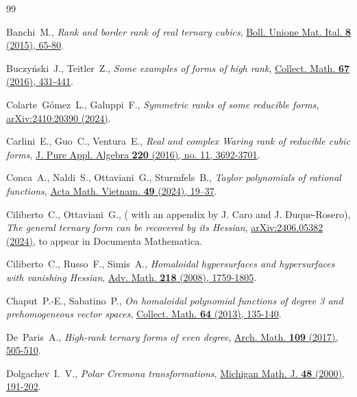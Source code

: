 \documentclass[aps,floatfix,groupedaddress,superscriptaddress,longbibliography,footinbib,notitlepage,showpacs]{revtex4-1}
\begin{document}

\begin{thebibliography}{99}

 {Banchi~M.,
\textit{Rank and border rank of real ternary cubics},
{\href{https://doi.org/10.1007/s40574-015-0027-z}{Boll. Unione Mat. Ital. \textbf{8} (2015), 65-80}}.}

 {Buczyński~J., Teitler~Z.,
\textit{Some examples of forms of high rank},
{\href{https://doi.org/10.1007/s13348-015-0152-0}{Collect. Math. \textbf{67} (2016), 431-441}}.}

 {Colarte~G\'omez~L., Galuppi~F.,
\textit{Symmetric ranks of some reducible forms},
{\href{https://doi.org/10.48550/arXiv.2410.20390}{arXiv:2410:20390 (2024)}}.}

 {Carlini~E., Guo~C., Ventura~E.,
\textit{Real and complex Waring rank of reducible cubic forms},
{\href{https://doi.org/10.1016/j.jpaa.2016.05.007}{J. Pure Appl. Algebra \textbf{220} (2016), no. 11, 3692-3701}}.}

 {Conca~A., Naldi~S., Ottaviani~G., Sturmfels~B.,
\textit{Taylor polynomials of rational functions},
{\href{https://doi.org/10.1007/s40306-023-00514-4}{Acta Math. Vietnam. \textbf{49} (2024), 19--37}}.}

 {Ciliberto~C., Ottaviani~G., ( with an appendix by J. Caro and J. Duque-Rosero),
\textit{The general ternary form can be recovered by its Hessian},
{\href{https://doi.org/10.48550/arXiv.2406.05382}{arXiv:2406.05382 (2024)}}, to appear in Documenta Mathematica.}

 {Ciliberto~C., Russo~F., Simis~A.,
\textit{Homaloidal hypersurfaces and hypersurfaces with vanishing Hessian},
{\href{https://doi.org/10.1016/j.aim.2008.03.025}{Adv. Math. \textbf{218} (2008), 1759-1805}}.}

 {Chaput~P.-E., Sabatino~P.,
\textit{On homaloidal polynomial functions of degree 3 and prehomogeneous vector spaces},
{\href{https://doi.org/10.1007/s13348-011-0046-8}{Collect. Math. \textbf{64} (2013), 135-140}}.}

 {De~Paris~A.,
\textit{High-rank ternary forms of even degree},
{\href{https://doi.org/10.1007/s00013-017-1105-5}{Arch. Math. \textbf{109} (2017), 505-510}}.}

 {Dolgachev~I.~V.,
\textit{Polar Cremona transformations},
{\href{https://doi.org/10.1307/mmj/1030132714}{Michigan Math. J. \textbf{48} (2000), 191-202}}.}


\end{thebibliography}
\end{document}
